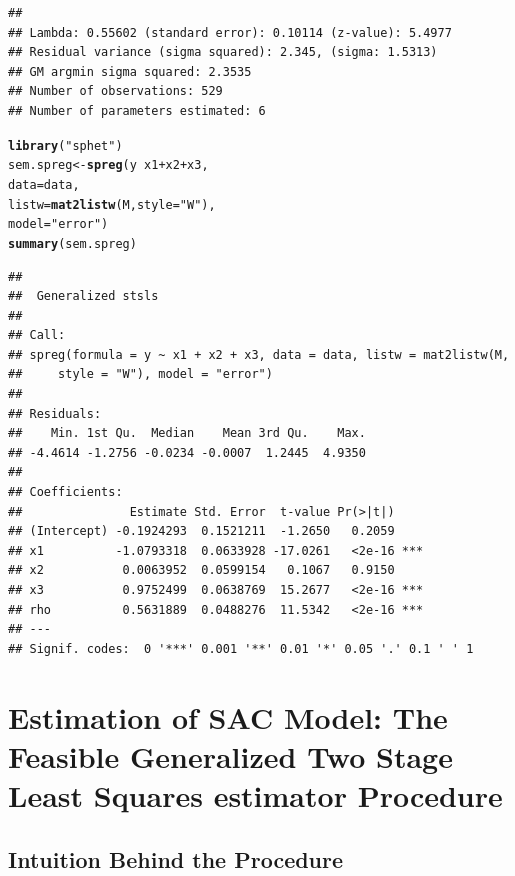 \documentclass[english,12pt]{book}\usepackage[]{graphicx}\usepackage[]{xcolor}
\makeatletter
\newcommand{\hlsng}[1]{\textcolor[rgb]{0.192,0.494,0.8}{#1}}%
\newcommand{\hlopt}[1]{\textcolor[rgb]{0,0,0}{#1}}%
\newcommand{\hldef}[1]{\textcolor[rgb]{0.345,0.345,0.345}{#1}}%
\newcommand{\hlkwb}[1]{\textcolor[rgb]{0.69,0.353,0.396}{#1}}%
\newcommand{\hlkwc}[1]{\textcolor[rgb]{0.333,0.667,0.333}{#1}}%
\newcommand{\hlkwd}[1]{\textcolor[rgb]{0.737,0.353,0.396}{\textbf{#1}}}%
\newenvironment{kframe}{%
 \def\at@end@of@kframe{}%
 \ifinner\ifhmode%
  \def\at@end@of@kframe{\end{minipage}}%
  \begin{minipage}{\columnwidth}%
 \fi\fi%
 \def\FrameCommand##1{\hskip\@totalleftmargin \hskip-\fboxsep
 \colorbox{shadecolor}{##1}\hskip-\fboxsep
     \hskip-\linewidth \hskip-\@totalleftmargin \hskip\columnwidth}%
 \MakeFramed {\advance\hsize-\width
   \@totalleftmargin\z@ \linewidth\hsize
   \@setminipage}}%
 {\par\unskip\endMakeFramed%
 \at@end@of@kframe}
\newenvironment{knitrout}{}{} %
\let\hlstd\hldef
\let\hlstr\hlsng
\makeatother
\begin{document}
\begin{knitrout}
\begin{kframe}
\begin{verbatim}
## 
## Lambda: 0.55602 (standard error): 0.10114 (z-value): 5.4977
## Residual variance (sigma squared): 2.345, (sigma: 1.5313)
## GM argmin sigma squared: 2.3535
## Number of observations: 529 
## Number of parameters estimated: 6
\end{verbatim}
\begin{alltt}
\hlkwd{library}\hlstd{(}\hlstr{"sphet"}\hlstd{)}
\hlstd{sem.spreg}    \hlkwb{<-} \hlkwd{spreg}\hlstd{(y} \hlopt{~} \hlstd{x1} \hlopt{+} \hlstd{x2} \hlopt{+} \hlstd{x3,}
                        \hlkwc{data} \hlstd{= data,}
                        \hlkwc{listw} \hlstd{=} \hlkwd{mat2listw}\hlstd{(M,} \hlkwc{style} \hlstd{=} \hlstr{"W"}\hlstd{),}
                        \hlkwc{model} \hlstd{=} \hlstr{"error"}\hlstd{)}
\hlkwd{summary}\hlstd{(sem.spreg)}
\end{alltt}
\begin{verbatim}
## 
##  Generalized stsls
## 
## Call:
## spreg(formula = y ~ x1 + x2 + x3, data = data, listw = mat2listw(M, 
##     style = "W"), model = "error")
## 
## Residuals:
##    Min. 1st Qu.  Median    Mean 3rd Qu.    Max. 
## -4.4614 -1.2756 -0.0234 -0.0007  1.2445  4.9350 
## 
## Coefficients:
##               Estimate Std. Error  t-value Pr(>|t|)    
## (Intercept) -0.1924293  0.1521211  -1.2650   0.2059    
## x1          -1.0793318  0.0633928 -17.0261   <2e-16 ***
## x2           0.0063952  0.0599154   0.1067   0.9150    
## x3           0.9752499  0.0638769  15.2677   <2e-16 ***
## rho          0.5631889  0.0488276  11.5342   <2e-16 ***
## ---
## Signif. codes:  0 '***' 0.001 '**' 0.01 '*' 0.05 '.' 0.1 ' ' 1
\end{verbatim}
\end{kframe}
\end{knitrout}


\section{Estimation of SAC Model: The Feasible Generalized Two Stage Least Squares estimator Procedure}\label{sec:sfg2sls-sac}

\subsection{Intuition Behind the Procedure}
\end{document}
